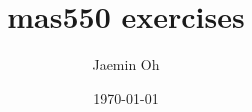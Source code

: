 \documentclass{amsart}
\date{\today}
\begin{document}
\author{Jaemin Oh}

\title{mas550 exercises}

\maketitle












\end{document}
